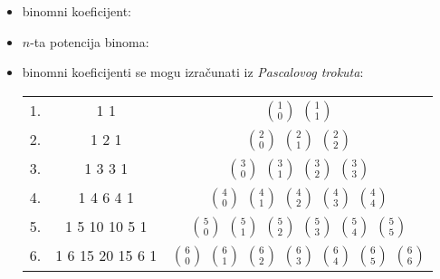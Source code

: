 \documentclass[10pt,oneside,a4paper]{report}
\begin{document}
\begin{itemize}
\item binomni koeficijent: \hspace{1cm} 
\item $n$-ta potencija binoma: \hspace{0.3cm}
\item binomni koeficijenti se mogu izra\v{c}unati iz \emph{Pascalovog
trokuta}:\\ 
\hspace*{2cm}
\begin{tabular}{lcc}
1. & 1 1 & $1 \choose 0$ $1\choose 1$ \\
2. & 1 2 1 & $2 \choose 0$ $2 \choose 1$ $2 \choose 2$\\
3. & 1 3 3 1 & $3 \choose 0$ $3\choose 1$ $3\choose 2$ $3\choose 3$\\
4. & 1 4 6 4 1 & $4 \choose 0$ $4\choose 1$ $4\choose 2$ $4\choose 3$ $4 \choose 4$\\
5. & 1 5 10 10 5 1 & $5 \choose 0$ $5\choose 1$ $5\choose 2$ $5\choose 3$ $5 \choose 4$ $5 \choose 5$\\
6. & 1 6 15 20 15 6 1 & $6 \choose 0$ $6\choose 1$ $6\choose 2$ $6\choose 3$ $6 \choose 4$ $6 \choose 5$ $6 \choose 6$\\
\end{tabular}
\end{itemize}
\end{document}
